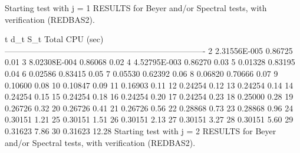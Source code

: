 Starting test with j =  1
RESULTS for Beyer and/or Spectral tests, with verification (REDBAS2).


    t           d_t           S_t      Total CPU (sec)
 -------------------------------------------------------------------------
    2    2.31556E-005       0.86725        0.01
    3    8.02308E-004       0.86068        0.02
    4    4.52795E-003       0.86270        0.03
    5         0.01328       0.83195        0.04
    6         0.02586       0.83415        0.05
    7         0.05530       0.62392        0.06
    8         0.06820       0.70666        0.07
    9         0.10600                      0.08
   10         0.10847                      0.09
   11         0.16903                      0.11
   12         0.24254                      0.12
   13         0.24254                      0.14
   14         0.24254                      0.15
   15         0.24254                      0.18
   16         0.24254                      0.20
   17         0.24254                      0.23
   18         0.25000                      0.28
   19         0.26726                      0.32
   20         0.26726                      0.41
   21         0.26726                      0.56
   22         0.28868                      0.73
   23         0.28868                      0.96
   24         0.30151                      1.21
   25         0.30151                      1.51
   26         0.30151                      2.13
   27         0.30151                      3.27
   28         0.30151                      5.60
   29         0.31623                      7.86
   30         0.31623                     12.28
Starting test with j =  2
RESULTS for Beyer and/or Spectral tests, with verification (REDBAS2).


